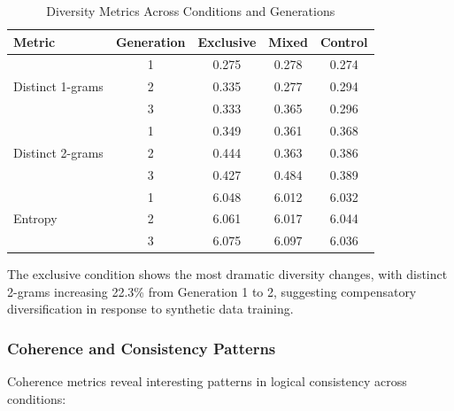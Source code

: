 \documentclass{article}
\begin{document}
\begin{table}[h]
\centering
\caption{Diversity Metrics Across Conditions and Generations}
\label{tab:diversity}
\begin{tabular}{@{}lcccc@{}}
\toprule
Metric & Generation & Exclusive & Mixed & Control \\
\midrule
\multirow{3}{*}{Distinct 1-grams} & 1 & 0.275 & 0.278 & 0.274 \\
                                  & 2 & 0.335 & 0.277 & 0.294 \\
                                  & 3 & 0.333 & 0.365 & 0.296 \\
\midrule
\multirow{3}{*}{Distinct 2-grams} & 1 & 0.349 & 0.361 & 0.368 \\
                                  & 2 & 0.444 & 0.363 & 0.386 \\
                                  & 3 & 0.427 & 0.484 & 0.389 \\
\midrule
\multirow{3}{*}{Entropy} & 1 & 6.048 & 6.012 & 6.032 \\
                         & 2 & 6.061 & 6.017 & 6.044 \\
                         & 3 & 6.075 & 6.097 & 6.036 \\
\bottomrule
\end{tabular}
\end{table}

The exclusive condition shows the most dramatic diversity changes, with distinct 2-grams increasing 22.3\% from Generation 1 to 2, suggesting compensatory diversification in response to synthetic data training.

\subsubsection{Coherence and Consistency Patterns}

Coherence metrics reveal interesting patterns in logical consistency across conditions:
\end{document}

